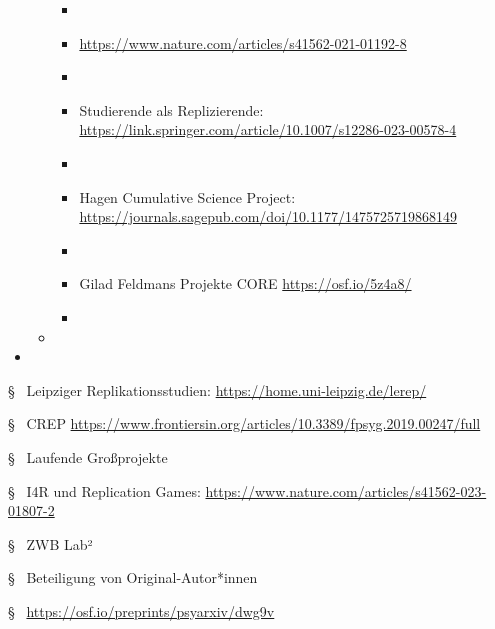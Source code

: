 \documentclass[
  letterpaper,
  DIV=11,
  numbers=noendperiod]{scrreprt}
\begin{document}
\begin{itemize}
\begin{itemize}
    \begin{itemize}
    \item
    \item
      \url{https://www.nature.com/articles/s41562-021-01192-8}
    \item
    \item
      Studierende als Replizierende:
      \url{https://link.springer.com/article/10.1007/s12286-023-00578-4}
    \item
    \item
      Hagen Cumulative Science Project:\\
      \url{https://journals.sagepub.com/doi/10.1177/1475725719868149}
    \item
    \item
      Gilad Feldmans Projekte CORE \url{https://osf.io/5z4a8/}
    \item
    \end{itemize}
  \item
  \end{itemize}
\item
\end{itemize}

§~ Leipziger Replikationsstudien:
\url{https://home.uni-leipzig.de/lerep/}

§~ CREP
\url{https://www.frontiersin.org/articles/10.3389/fpsyg.2019.00247/full}

§~ Laufende Großprojekte

§~ I4R und Replication Games:
\url{https://www.nature.com/articles/s41562-023-01807-2}

§~ ZWB Lab²

§~ Beteiligung von Original-Autor*innen

§~ \url{https://osf.io/preprints/psyarxiv/dwg9v}
\end{document}
